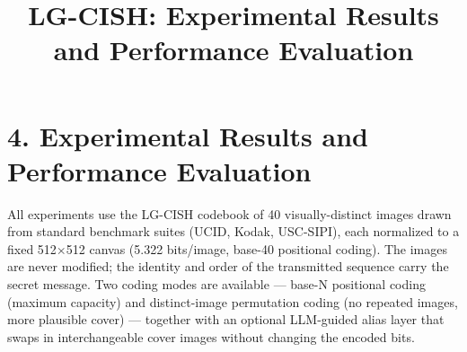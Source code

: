 \documentclass[11pt]{article}
\title{\vspace{-2em}LG-CISH: Experimental Results and Performance Evaluation}
\author{}
\date{}
\begin{document}
\maketitle
\vspace{-3em}

\section*{4. Experimental Results and Performance Evaluation}
All experiments use the LG-CISH codebook of 40 visually-distinct images drawn from standard benchmark suites (UCID, Kodak, USC-SIPI), each normalized to a fixed 512$\times$512 canvas (5.322 bits/image, base-40 positional coding). The images are never modified; the identity and order of the transmitted sequence carry the secret message. Two coding modes are available --- base-N positional coding (maximum capacity) and distinct-image permutation coding (no repeated images, more plausible cover) --- together with an optional LLM-guided alias layer that swaps in interchangeable cover images without changing the encoded bits.
\end{document}
